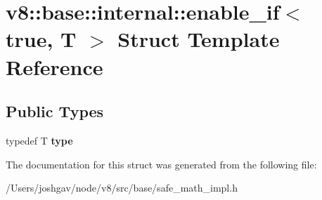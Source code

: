 \hypertarget{structv8_1_1base_1_1internal_1_1enable__if_3_01true_00_01_t_01_4}{}\section{v8\+:\+:base\+:\+:internal\+:\+:enable\+\_\+if$<$ true, T $>$ Struct Template Reference}
\label{structv8_1_1base_1_1internal_1_1enable__if_3_01true_00_01_t_01_4}
\subsection*{Public Types}
\begin{DoxyCompactItemize}
\item 
typedef T {\bfseries type}\hypertarget{structv8_1_1base_1_1internal_1_1enable__if_3_01true_00_01_t_01_4_a0990faefecf53f01f4922e66b64bc31a}{}\label{structv8_1_1base_1_1internal_1_1enable__if_3_01true_00_01_t_01_4_a0990faefecf53f01f4922e66b64bc31a}

\end{DoxyCompactItemize}


The documentation for this struct was generated from the following file\+:\begin{DoxyCompactItemize}
\item 
/\+Users/joshgav/node/v8/src/base/safe\+\_\+math\+\_\+impl.\+h\end{DoxyCompactItemize}
